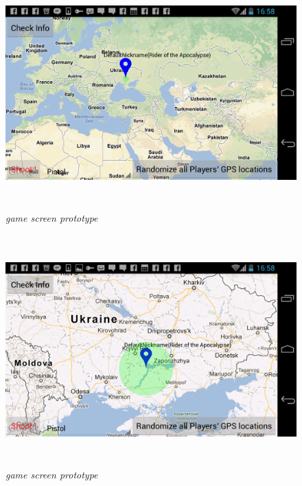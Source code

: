 \documentclass{article}
\begin{document}
\begin{figure}
\includegraphics[height=3.5in,width=6.23in]{./images/android_screenshots/ui_prototype/UI_prototype_1.png}  
\caption{\small \sl game screen prototype \label{fig:UIPrototype1}}
\end{figure}

\begin{figure}
\includegraphics[height=3.5in,width=6.23in]{./images/android_screenshots/ui_prototype/UI_prototype_2.png}  
\caption{\small \sl game screen prototype \label{fig:UIPrototype2}}
\end{figure}
\end{document}
